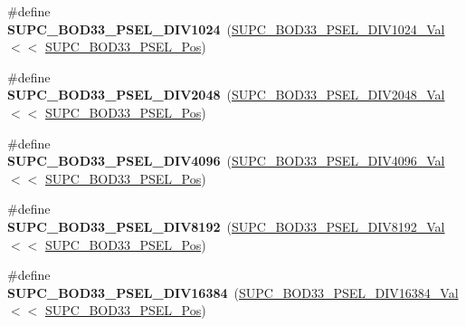 \begin{DoxyCompactItemize}
\item 
\hypertarget{group___s_a_m_l21___s_u_p_c_ga1e0462c75682ab41a4b77e5f3bd5a01b}{}\#define {\bfseries S\+U\+P\+C\+\_\+\+B\+O\+D33\+\_\+\+P\+S\+E\+L\+\_\+\+D\+I\+V1024}~(\hyperlink{group___s_a_m_l21___s_u_p_c_gaa0f2c18f38e2ffcf4955812914e61e46}{S\+U\+P\+C\+\_\+\+B\+O\+D33\+\_\+\+P\+S\+E\+L\+\_\+\+D\+I\+V1024\+\_\+\+Val}   $<$$<$ \hyperlink{group___s_a_m_l21___s_u_p_c_ga749aed0ecd13c1a62c80e107cfe7e31f}{S\+U\+P\+C\+\_\+\+B\+O\+D33\+\_\+\+P\+S\+E\+L\+\_\+\+Pos})\label{group___s_a_m_l21___s_u_p_c_ga1e0462c75682ab41a4b77e5f3bd5a01b}

\item 
\hypertarget{group___s_a_m_l21___s_u_p_c_gac07f2205b75ee6cbd9ac8578bf956e2b}{}\#define {\bfseries S\+U\+P\+C\+\_\+\+B\+O\+D33\+\_\+\+P\+S\+E\+L\+\_\+\+D\+I\+V2048}~(\hyperlink{group___s_a_m_l21___s_u_p_c_ga55e406301f6fd1b9abe16e95e351144d}{S\+U\+P\+C\+\_\+\+B\+O\+D33\+\_\+\+P\+S\+E\+L\+\_\+\+D\+I\+V2048\+\_\+\+Val}   $<$$<$ \hyperlink{group___s_a_m_l21___s_u_p_c_ga749aed0ecd13c1a62c80e107cfe7e31f}{S\+U\+P\+C\+\_\+\+B\+O\+D33\+\_\+\+P\+S\+E\+L\+\_\+\+Pos})\label{group___s_a_m_l21___s_u_p_c_gac07f2205b75ee6cbd9ac8578bf956e2b}

\item 
\hypertarget{group___s_a_m_l21___s_u_p_c_gacf9a1d6a82e221648b99ffab01f8dcae}{}\#define {\bfseries S\+U\+P\+C\+\_\+\+B\+O\+D33\+\_\+\+P\+S\+E\+L\+\_\+\+D\+I\+V4096}~(\hyperlink{group___s_a_m_l21___s_u_p_c_gadfeaf2b4786ae11fd3abf39d094b2b3e}{S\+U\+P\+C\+\_\+\+B\+O\+D33\+\_\+\+P\+S\+E\+L\+\_\+\+D\+I\+V4096\+\_\+\+Val}   $<$$<$ \hyperlink{group___s_a_m_l21___s_u_p_c_ga749aed0ecd13c1a62c80e107cfe7e31f}{S\+U\+P\+C\+\_\+\+B\+O\+D33\+\_\+\+P\+S\+E\+L\+\_\+\+Pos})\label{group___s_a_m_l21___s_u_p_c_gacf9a1d6a82e221648b99ffab01f8dcae}

\item 
\hypertarget{group___s_a_m_l21___s_u_p_c_ga6a780865aaa40d206723613fd769d3b7}{}\#define {\bfseries S\+U\+P\+C\+\_\+\+B\+O\+D33\+\_\+\+P\+S\+E\+L\+\_\+\+D\+I\+V8192}~(\hyperlink{group___s_a_m_l21___s_u_p_c_gad607b6a115fde5b6a6a24d6a448e9173}{S\+U\+P\+C\+\_\+\+B\+O\+D33\+\_\+\+P\+S\+E\+L\+\_\+\+D\+I\+V8192\+\_\+\+Val}   $<$$<$ \hyperlink{group___s_a_m_l21___s_u_p_c_ga749aed0ecd13c1a62c80e107cfe7e31f}{S\+U\+P\+C\+\_\+\+B\+O\+D33\+\_\+\+P\+S\+E\+L\+\_\+\+Pos})\label{group___s_a_m_l21___s_u_p_c_ga6a780865aaa40d206723613fd769d3b7}

\item 
\hypertarget{group___s_a_m_l21___s_u_p_c_ga6a211857de8a83407812a0275fa420a1}{}\#define {\bfseries S\+U\+P\+C\+\_\+\+B\+O\+D33\+\_\+\+P\+S\+E\+L\+\_\+\+D\+I\+V16384}~(\hyperlink{group___s_a_m_l21___s_u_p_c_gab6f5f059bffd60fb9f4798a4c356d61f}{S\+U\+P\+C\+\_\+\+B\+O\+D33\+\_\+\+P\+S\+E\+L\+\_\+\+D\+I\+V16384\+\_\+\+Val}  $<$$<$ \hyperlink{group___s_a_m_l21___s_u_p_c_ga749aed0ecd13c1a62c80e107cfe7e31f}{S\+U\+P\+C\+\_\+\+B\+O\+D33\+\_\+\+P\+S\+E\+L\+\_\+\+Pos})\label{group___s_a_m_l21___s_u_p_c_ga6a211857de8a83407812a0275fa420a1}


\end{DoxyCompactItemize}
